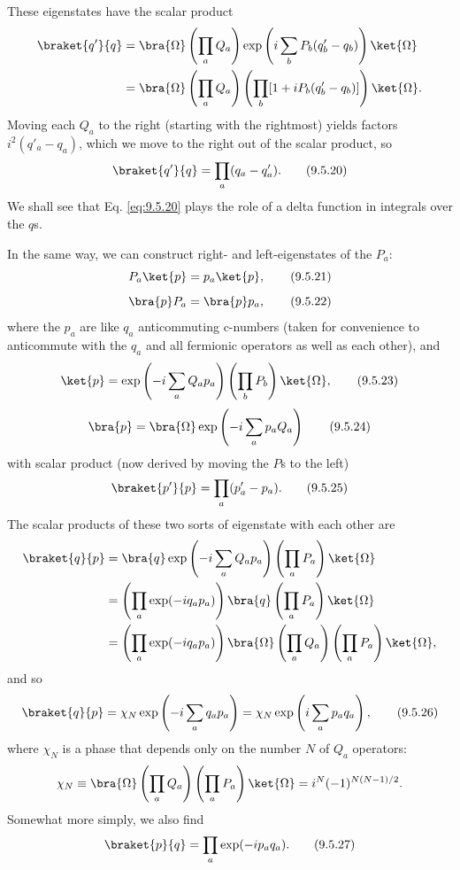 These eigenstates have the scalar product
\begin{align*}
\braket{q'}{q}
&=\bra{\Omega}\left(\prod_aQ_a\right)
 \exp\left(i\sum_bP_b(q'_b-q_b)\right)\ket{\Omega}\\
&=\bra{\Omega}\left(\prod_aQ_a\right)
 \left(\prod_b[1+iP_b(q'_b-q_b)]\right)\ket{\Omega}.
\end{align*}
Moving each $Q_a$ to the right (starting with the rightmost) yields factors
$i^2(q'_a-q_a)$, which we move to the right out of the scalar product, so
\begin{equation}
\braket{q'}{q}=\prod_a(q_a-q'_a).
\tag{9.5.20}\label{eq:9.5.20}
\end{equation}
We shall see that Eq. \eqref{eq:9.5.20} plays the role of a delta function in integrals
over the $q$s.

In the same way, we can construct right- and left-eigenstates of the $P_a$:
\begin{equation}
P_a\ket{p}=p_a\ket{p},
\tag{9.5.21}\label{eq:9.5.21}
\end{equation}
\begin{equation}
\bra{p}P_a=\bra{p}p_a,
\tag{9.5.22}\label{eq:9.5.22}
\end{equation}
where the $p_a$ are like $q_a$ anticommuting c-numbers (taken for convenience
to anticommute with the $q_a$ and all fermionic operators as well as each
other), and
\begin{equation}
\ket{p}=\exp\left(-i\sum_aQ_ap_a\right)
 \left(\prod_bP_b\right)\ket{\Omega},
\tag{9.5.23}\label{eq:9.5.23}
\end{equation}
\begin{equation}
\bra{p}=\bra{\Omega}\exp\left(-i\sum_a p_aQ_a\right)
\tag{9.5.24}\label{eq:9.5.24}
\end{equation}
with scalar product (now derived by moving the $P$s to the left)
\begin{equation}
\braket{p'}{p}=\prod_a(p'_a-p_a).
\tag{9.5.25}\label{eq:9.5.25}
\end{equation}
The scalar products of these two sorts of eigenstate with each other are
\begin{align*}
\braket{q}{p}
&=\bra{q}\exp\left(-i\sum_aQ_ap_a\right)
 \left(\prod_aP_a\right)\ket{\Omega}\\
&=\left(\prod_a\exp(-iq_ap_a)\right)
 \bra{q}\left(\prod_aP_a\right)\ket{\Omega}\\
&=\left(\prod_a\exp(-iq_ap_a)\right)
 \bra{\Omega}\left(\prod_aQ_a\right)
 \left(\prod_aP_a\right)\ket{\Omega},
\end{align*}
and so
\begin{equation}
\braket{q}{p}=\chi_N\exp\left(-i\sum_aq_ap_a\right)
=\chi_N\exp\left(i\sum_ap_aq_a\right),
\tag{9.5.26}\label{eq:9.5.26}
\end{equation}
where $\chi_N$ is a phase that depends only on the number $N$ of $Q_a$
operators:
\[
\chi_N\equiv\bra{\Omega}\left(\prod_aQ_a\right)
 \left(\prod_aP_a\right)\ket{\Omega}
=i^N(-1)^{N(N-1)/2}.
\]
Somewhat more simply, we also find
\begin{equation}
\braket{p}{q}=\prod_a\exp(-ip_aq_a).
\tag{9.5.27}\label{eq:9.5.27}
\end{equation}

